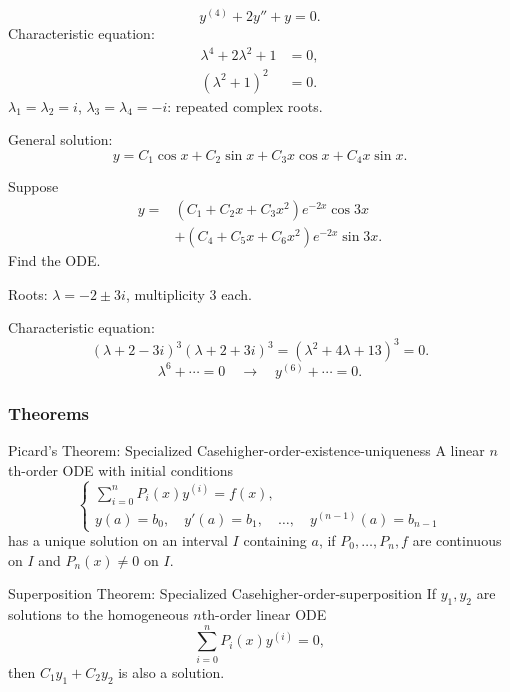 \begin{example}
  \[
    y^{(4)}+2y''+y=0.
  \]
  Characteristic equation:
  \begin{align*}
    \lambda^4+2\lambda^2+1 & =0, \\
    (\lambda^2+1)^2        & =0.
  \end{align*}
  $\lambda_1=\lambda_2=i$, $\lambda_3=\lambda_4=-i$: repeated complex roots.

  General solution:
  \[
    y=C_1\cos x+C_2\sin x+C_3x\cos x+C_4x\sin x.
  \]
\end{example}

\begin{example}
  Suppose
  \begin{align*}
    y={} & (C_1+C_2x+C_3x^2)e^{-2x}\cos3x   \\
         & +(C_4+C_5x+C_6x^2)e^{-2x}\sin3x.
  \end{align*}
  Find the ODE.

  Roots: $\lambda=-2\pm3i$, multiplicity $3$ each.

  Characteristic equation:
  \[
    (\lambda+2-3i)^3(\lambda+2+3i)^3
    =(\lambda^2+4\lambda+13)^3=0.
  \]
  \[
    \lambda^6+\cdots=0
    \quad\longrightarrow\quad y^{(6)}+\cdots=0.
  \]
\end{example}

\subsubsection{Theorems}

\begin{theorem}{Picard's Theorem: Specialized Case}{higher-order-existence-uniqueness}
  A linear $n$th-order ODE with initial conditions
  \[
    \begin{cases}
      \displaystyle\sum_{i=0}^n P_i(x)y^{(i)}=f(x), \\
      y(a)=b_0,\quad y'(a)=b_1,\quad\ldots,\quad y^{(n-1)}(a)=b_{n-1}
    \end{cases}
  \]
  has a unique solution on an interval $I$ containing $a$, if $P_0,\ldots,P_n,f$
  are continuous on $I$ and $P_n(x)\ne0$ on $I$.
\end{theorem}

\begin{theorem}{Superposition Theorem: Specialized Case}{higher-order-superposition}
  If $y_1,y_2$ are solutions to the homogeneous $n$th-order linear ODE
  \[
    \sum_{i=0}^n P_i(x)y^{(i)}=0,
  \]
  then $C_1y_1+C_2y_2$ is also a solution.
\end{theorem}

